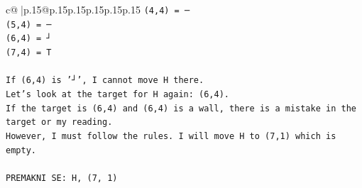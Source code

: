 \documentclass{article}
\begin{document}
{\begin{supertabular}{c@{$\;$}|p{.15\linewidth}@{}p{.15\linewidth}p{.15\linewidth}p{.15\linewidth}p{.15\linewidth}p{.15\linewidth}}
{{{\texttt{(4,4) = ─} \\
\texttt{(5,4) = ─} \\
\texttt{(6,4) = ┘} \\
\texttt{(7,4) = T} \\
\\ 
\texttt{If (6,4) is '┘', I cannot move H there.} \\
\texttt{Let's look at the target for H again: (6,4).} \\
\texttt{If the target is (6,4) and (6,4) is a wall, there is a mistake in the target or my reading.} \\
\texttt{However, I must follow the rules. I will move H to (7,1) which is empty.} \\
\\ 
\texttt{PREMAKNI SE: H, (7, 1)} \\
            }
        }
    }
     \\ \\


\end{supertabular}}
\end{document}
